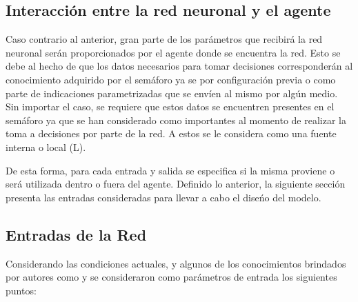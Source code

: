 \subsection{Interacci\'{o}n entre la red neuronal y el agente}

Caso contrario al anterior, gran parte de los par\'{a}metros que recibir\'{a} la red neuronal ser\'{a}n proporcionados por el agente donde se encuentra la red. Esto se debe al hecho de que los datos necesarios para tomar decisiones corresponder\'{a}n al conocimiento adquirido por el sem\'{a}foro ya se por configuraci\'{o}n previa o como parte de indicaciones parametrizadas que se env\'{i}en al mismo por alg\'{u}n medio. Sin importar el caso, se requiere que estos datos se encuentren presentes en el sem\'{a}foro ya que se han considerado como importantes al momento de realizar la toma a decisiones por parte de la red. A estos se le considera como una fuente interna o local (L).

De esta forma, para cada entrada y salida se especifica si la misma proviene o ser\'{a} utilizada dentro o fuera del agente. Definido lo anterior, la siguiente secci\'{o}n presenta las entradas consideradas para llevar a cabo el dise\'{n}o del modelo.

\subsection{Entradas de la Red}

Considerando las condiciones actuales, y algunos de los conocimientos brindados por autores como \cite{Srinivasan2006} y \cite{Gilmore1993} %
se consideraron como par\'{a}metros de entrada los siguientes puntos:

